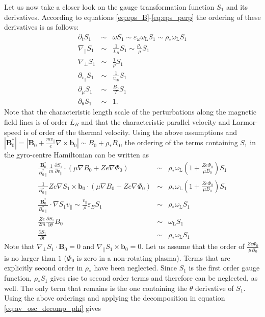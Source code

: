 \documentclass[a4paper,10pt]{article}
\newcommand{\st}[1]{\mathrm{#1}} %
\begin{document}
Let us now take a closer look on the gauge transformation function $S_1$ and its derivatives. According to equations \ref{eq:eps_B}-\ref{eq:eps_perp} the ordering of these derivatives is as follows:
\begin{eqnarray*}
	\partial_t S_1 &\sim& \omega S_1 \sim \varepsilon_{\omega} \omega_{\st{L}} S_1 \sim \rho_* \omega_{\st{L}} S_1 \\
	\nabla_{\parallel} S_1 &\sim& \frac{1}{L_B} S_1 \sim \frac{\rho_*}{\rho} S_1 \\
	\nabla_{\perp} S_1 &\sim& \frac{1}{\rho} S_1 \\
	\partial _{v_{\parallel}} S_1&\sim& \frac{1}{v_{\st{th}}} S_1 \\
	\partial_{\mu} S_1 &\sim& \frac{B_0}{T} S_1 \\
	\partial_{\theta} S_1 &\sim& 1.
\end{eqnarray*}
Note that the characteristic length scale of the perturbations along the magnetic field lines is of order $L_B$ and that the characteristic parallel velocity and Larmor-speed is of order of the thermal velocity. Using the above assumptions and $|\mathbf{B}_0^{*}| = \left| \mathbf{B}_0 + \frac{m v_{\parallel}}{e} \nabla \times \mathbf{b}_0 \right| \sim B_0 + \rho_* B_0$, the ordering of the terms containing $S_1$ in the gyro-centre Hamiltonian can be written as
\begin{eqnarray*}
	\frac{\mathbf{B}_0^{*}}{B_{0 \parallel}^{*}} \frac{1}{m} \frac{\partial S_1}{\partial v_{\parallel}} \cdot (\mu \nabla B_0 + Z e \nabla \Phi_0) &\sim& \rho_* \omega_{\st{L}} \left( 1 + \frac{Z e \Phi_0}{\mu B_0} \right) S_1 \\
	\frac{1}{B_{0 \parallel}^{*}} Z e \nabla S_1 \times \mathbf{b}_0 \cdot (\mu \nabla B_0 + Z e \nabla \Phi_0) &\sim& \rho_* \omega_{\st{L}} \left( 1 + \frac{Z e \Phi_0}{\mu B_0} \right) S_1 \\
	\frac{\mathbf{B}_0^{*}}{B_{0 \parallel}^{*}} \cdot \nabla S_1 v_{\parallel} \sim \frac{v_{\parallel}}{\rho} \varepsilon_B S_1 &\sim& \rho_* \omega_{\st{L}} S_1 \\
	\frac{Z e}{2 m} \frac{\partial S_1}{\partial \theta} B_0 &\sim& \omega_{\st{L}} S_1 \\
	\frac{\partial S_1}{\partial t} &\sim& \rho_* \omega_{\st{L}} S_1
\end{eqnarray*}
Note that $\nabla_{\perp} S_1 \cdot \mathbf{B}_0 = 0$ and $\nabla_{\parallel} S_1 \times \mathbf{b}_0 = 0$. Let us assume that the order of $\frac{Z e \Phi_0}{\mu B_0}$ is no larger than $1$ ($\Phi_0$ is zero in a non-rotating plasma). Terms that are explicitly second order in $\rho_*$ have been neglected. Since $S_1$ is the first order gauge function, $\rho_* S_1$ gives rise to second order terms and therefore can be neglected, as well. The only term that remains is the one containing the $\theta$ derivative of $S_1$. Using the above orderings and applying the decomposition in equation \ref{eq:av_osc_decomp_phi} gives
\end{document}
